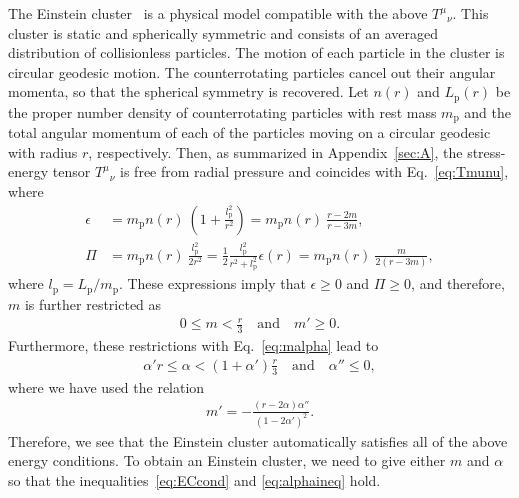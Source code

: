 \documentclass[aps,11pt,nofootinbib,preprintnumbers,groupedaddress,superscriptaddress]{revtex4-2}
\begin{document}
The Einstein cluster~\cite{Einstein:1939,Geralico:2012jt} is a 
physical model compatible with the above $T^\mu{}_\nu$. This cluster is static and spherically symmetric and consists of 
an averaged distribution of collisionless particles. 
The motion of each particle in the cluster is circular geodesic motion. 
The counterrotating particles cancel out their angular momenta, so that the spherical symmetry is recovered.
Let $n(r)$ and $L_{\mathrm{p}}(r)$ be the proper number density of counterrotating 
particles with rest mass $m_{\mathrm{p}}$ and the total angular momentum of each 
of the particles moving on a circular geodesic with radius $r$, respectively.
Then, as summarized in Appendix~\ref{sec:A}, the stress-energy tensor $T^\mu{}_\nu$ is free from radial pressure and coincides with Eq.~\eqref{eq:Tmunu}, where
\begin{align}
\label{eq:ep2}
\epsilon&=m_{\mathrm{p}} n(r) \:\!\left(
1+\frac{l_{\mathrm{p}}^2}{r^2}
\right)=m_{\mathrm{p}} n(r) \:\!\frac{r-2m}{r-3m},
\\
\label{eq:PI2}
\Pi&
=m_{\mathrm{p}} n(r) \:\!
\frac{l_{\mathrm{p}}^2}{2r^2}
=\frac{1}{2} 
\frac{l_{\mathrm{p}}^2}{r^2+l_{\mathrm{p}}^2}
\epsilon(r)=m_{\mathrm{p}} n(r) \:\!\frac{m}{2(r-3m)},
\end{align}
where $l_{\mathrm{p}}=L_{\mathrm{p}}/m_{\mathrm{p}}$.
These expressions imply that $\epsilon\geq 0$ and $\Pi\geq 0$, and therefore, $m$ is further restricted as
\begin{align}
\label{eq:ECcond}
0\le m<\frac{r}{3} \quad \mathrm{and} \quad 
m'\geq0.
\end{align}
Furthermore, 
these restrictions with Eq.~\eqref{eq:malpha} lead to 
\begin{align}
\label{eq:alphaineq}
\alpha' r \leq \alpha < (1+\alpha') \frac{r}{3} 
\quad \mathrm{and} \quad 
\alpha''\le 0,
\end{align}
where we have used the relation
\begin{align}
m'=-\frac{(r-2\alpha) \alpha''}{(1-2\alpha')^2}.
\end{align}
Therefore, we see that the Einstein cluster automatically satisfies all of the above energy conditions.
To obtain an Einstein cluster, we need to give either 
$m$ and $\alpha$ so that the inequalities~\eqref{eq:ECcond} and \eqref{eq:alphaineq} hold. 
 
\end{document}
